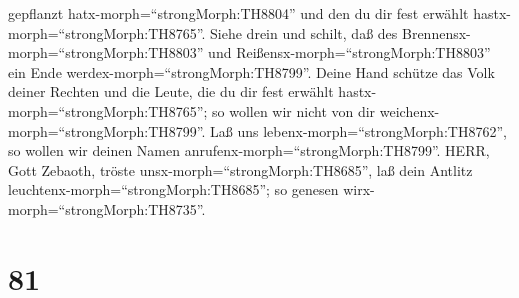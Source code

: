 gepflanzt hatx-morph=``strongMorph:TH8804'' und den du dir fest erwählt
hastx-morph=``strongMorph:TH8765''.  Siehe drein und
schilt, daß des Brennensx-morph=``strongMorph:TH8803'' und
Reißensx-morph=``strongMorph:TH8803'' ein Ende
werdex-morph=``strongMorph:TH8799''.  Deine Hand schütze
das Volk deiner Rechten und die Leute, die du dir fest erwählt
hastx-morph=``strongMorph:TH8765'';  so wollen wir nicht
von dir weichenx-morph=``strongMorph:TH8799''. Laß uns
lebenx-morph=``strongMorph:TH8762'', so wollen wir deinen Namen
anrufenx-morph=``strongMorph:TH8799''.  HERR, Gott Zebaoth,
tröste unsx-morph=``strongMorph:TH8685'', laß dein Antlitz
leuchtenx-morph=``strongMorph:TH8685''; so genesen
wirx-morph=``strongMorph:TH8735''.

\hypertarget{section-80}{%
\section{81}\label{section-80}}

